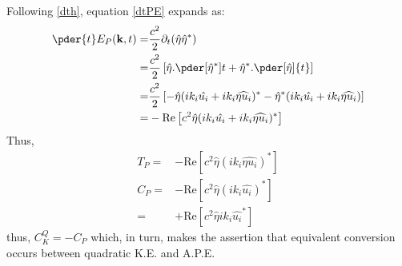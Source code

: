 Following \eqref{dth}, equation \eqref{dtPE} expands as:
\begin{align*}
    \pder{t}E_P(\mathbf{k},t)
    = & \frac{c^2}{2}\partial_t({\hat \eta}{\hat \eta^*})                 \\
    = & \frac{c^2}{2}\left[ \hat{\eta} .\pder[\hat{\eta}^*]{t}+ \hat
        \eta^*.\pder[\hat \eta]{t}\right]                                 \\
    = & \frac{c^2}{2}\left[ - \hat{\eta} (ik_i\hat{ u_i } + ik_i\widehat{
            \eta u_i })^*
        - \hat{\eta}^* (ik_i\hat{ u_i } + ik_i\widehat{
            \eta u_i })  \right]                                          \\
    = & -\text{Re}\left[c^2\hat{\eta} (ik_i\hat{ u_i } + ik_i\widehat{
            \eta u_i })^* \right]
\end{align*}
Thus,
\begin{align}
    T_P= & -\text{Re}\left[c^2\hat{\eta} (ik_i\widehat{
            \eta u_i })^*  \right]                                 \\
    C_P= & -\text{Re}\left[c^2\hat{\eta} (ik_i\hat{u_i })^*\right] \\
    =    & +\text{Re}\left[c^2\hat{\eta} ik_i\hat{u_i }^*\right]
\end{align}
thus, $C^Q_K = -C_P$ which, in turn, makes the assertion that
equivalent conversion occurs between quadratic K.E. and A.P.E.
% 
% 
% 

% 
